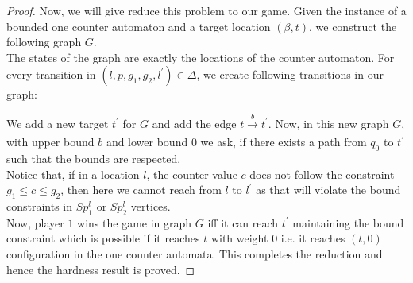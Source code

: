 \begin{proof}
\vskip 0.2cm
Now, we will give reduce this problem to our game. Given the instance of a bounded one counter automaton and a target location $(\beta,t)$, we construct the following graph $G$.\\
The states of the graph are exactly the locations of the counter automaton. For every transition in $(l, p, g_1, g_2,l^{\prime}) \in \Delta$, we create following transitions in our graph: \\
\begin{figure}[htb]
\hskip 2cm
\end{figure}
\vskip 0.5cm
We add a new target $t^{\prime}$ for $G$ and add the edge $t \xrightarrow[]{b} t^{\prime}$. Now, in this new graph $G$, with upper bound $b$ and lower bound $0$ we ask, if there exists a path from $q_0$ to $t^{\prime}$ such that the bounds are respected.\\
Notice that, if in a location $l$, the counter value $c$ does not follow the constraint $g_1 \leq c \leq g_2$, then here we cannot reach from $l$ to $l^{\prime}$ as that will violate the bound constraints in $Sp^{l}_1$ or $Sp^{l}_2$ vertices.\\
Now, player $1$ wins the game in graph $G$ iff it can reach $t^{\prime}$ maintaining the bound constraint which is possible if it reaches $t$ with weight $0$ i.e. it reaches $(t,0)$ configuration in the one counter automata. This completes the reduction and hence the hardness result is proved.
\end{proof}

